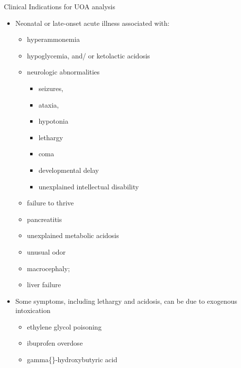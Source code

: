 \documentclass[presentation]{beamer}
\begin{document}
\begin{frame}[label={sec:orgheadline10}]{Clinical Indications for UOA analysis}
\begin{itemize}
\item Neonatal or late-onset acute illness associated with:
\begin{itemize}
\item hyperammonemia
\item hypoglycemia, and/ or ketolactic acidosis
\item neurologic abnormalities
\begin{itemize}
\item seizures,
\item ataxia,
\item hypotonia
\item lethargy
\item coma
\item developmental delay
\item unexplained intellectual disability
\end{itemize}
\item failure to thrive
\item pancreatitis
\item unexplained metabolic acidosis
\item unusual odor
\item macrocephaly;
\item liver failure
\end{itemize}
\item Some symptoms, including lethargy and acidosis, can be due to exogenous intoxication
\begin{itemize}
\item ethylene glycol poisoning
\item ibuprofen overdose
\item gamma\{\}-hydroxybutyric acid
\end{itemize}
\end{itemize}
\end{frame}
\end{document}
